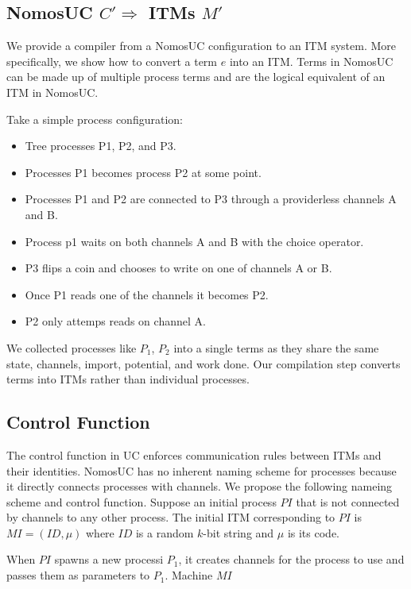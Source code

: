 \subsection{NomosUC $C' \Rightarrow$ ITMs $M'$}
We provide a compiler from a NomosUC configuration to an ITM system. 
More specifically, we show how to convert a term $e$ into an ITM. 
Terms in NomosUC can be made up of multiple process terms and are the logical equivalent of an ITM in NomosUC. 

Take a simple process configuration:
\begin{itemize}
	\item Tree processes P1, P2, and P3. 
	\item Processes P1 becomes process P2 at some point.
	\item Processes P1 and P2 are connected to P3 through a providerless channels A and B.
	\item Process p1 waits on both channels A and B with the choice operator.
	\item P3 flips a coin and chooses to write on one of channels A or B.
	\item Once P1 reads one of the channels it becomes P2.
	\item P2 only attemps reads on channel A.
\end{itemize}

We collected processes like $P_1$, $P_2$ into a single terms as they share the same state, channels, import, potential, and work done.
Our compilation step converts terms into ITMs rather than individual processes. 


\subsection{Control Function}
The control function in UC enforces communication rules between ITMs and their identities.
NomosUC has no inherent naming scheme for processes because it directly connects processes with channels. 
We propose the following nameing scheme and control function. Suppose an initial process $PI$ that is not connected by channels to any other process.
The initial ITM corresponding to $PI$ is $MI = (ID, \mu)$ where $ID$ is a random $k$-bit string and $\mu$ is its code.

When $PI$ spawns a new processi $P_1$, it creates channels for the process to use and passes them as parameters to $P_1$. 
Machine $MI$ 

